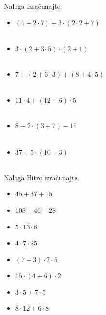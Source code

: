         \begin{frame}
            \begin{exampleblock}{Naloga}
                Izračunajte.
                \begin{itemize}
                    \item $(1+2\cdot 7)+3\cdot(2\cdot 2+7)$ \\ ~
                    \item $3\cdot(2+3\cdot 5)\cdot(2+1)$ \\ ~
                    \item $7+(2+6\cdot 3)+(8+4\cdot 5)$ \\ ~
                    \item $11\cdot 4+(12-6)\cdot 5$ \\ ~
                    \item $8+2\cdot(3+7)-15$ \\ ~
                    \item $37-5\cdot(10-3)$ \\ ~
                \end{itemize}
            \end{exampleblock}
        \end{frame}

        \begin{frame}
            \begin{exampleblock}{Naloga}
                Hitro izračunajte.
                \begin{itemize}
                    \item $45+37+15$ 
                    \item $108+46-28$
                    \item $5\cdot 13\cdot 8$
                    \item $4\cdot 7\cdot 25$
                    \item $(7+3)\cdot 2\cdot 5$
                    \item $15\cdot(4+6)\cdot 2$
                    \item $3\cdot 5+7\cdot 5$
                    \item $8\cdot 12+6\cdot 8$
                \end{itemize}
            \end{exampleblock}
        \end{frame}

